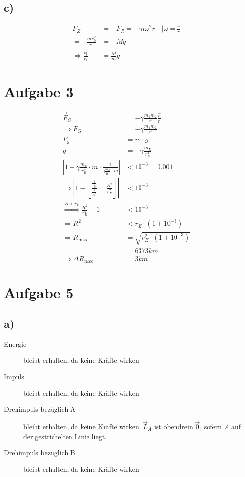 \documentclass[12pt,a4paper,notitlepage]{article}
\newcommand{\aufgabe}[1]{\section*{\setcounter{section}{#1}Aufgabe #1}}
\begin{document}
\subsection*{c)}
\begin{align}
F_Z&=-F_R=-m\omega^2r\quad\Big|\omega=\frac{v}{r}\\
=-\frac{mv_0^2}{r_0}&=-Mg\\
\Rightarrow\frac{v_0^2}{r_0}&=\frac{M}{m}g
\end{align}
\aufgabe{3}
\begin{align}
\vec F_G&=-\gamma\frac{m_1m_2}{r^2}\frac{\vec r}{r}\\
\Rightarrow F_G&=-\gamma\frac{m_1m_2}{r^2}\\
F_g&=m\cdot g\\
g&=-\gamma\frac{m_E}{r_E^2}\\
\left|1-\gamma\frac{m_E}{r_E^2}\cdot m\cdot\frac{1}{\gamma\frac{m_E}{R^2}\cdot m}\right|&<10^{-3}=0.001\\
\Rightarrow\left|1-\left[\frac{\frac{1}{r_E^2}}{\frac{1}{R^2}}=\frac{R^2}{r_E^2}\right]\right|&<10^{-3}\\
\stackrel{R>r_E}{\Rightarrow}\frac{R^2}{r_E^2}-1&<10^{-3}\\
\Rightarrow R^2&<r_E\cdot\left(1+10^{-3}\right)\\
\Rightarrow R_{\text{max}}&=\sqrt{r_E^2\cdot\left(1+10^{-3}\right)}\\
&=6373km\\
\Rightarrow\Delta R_{\text{max}}&=3km
\end{align}
\aufgabe{5}
\subsection*{a)}
\begin{description}
\item[Energie] bleibt erhalten, da keine Kräfte wirken.
\item[Impuls] bleibt erhalten, da keine Kräfte wirken.
\item[Drehimpuls bezüglich A] bleibt erhalten, da keine Kräfte wirken. $\vec L_A$ ist obendrein $\vec 0$, sofern $A$ auf der gestrichelten Linie liegt.
\item[Drehimpuls bezüglich B] bleibt erhalten, da keine Kräfte wirken.
\end{description}
\end{document}
